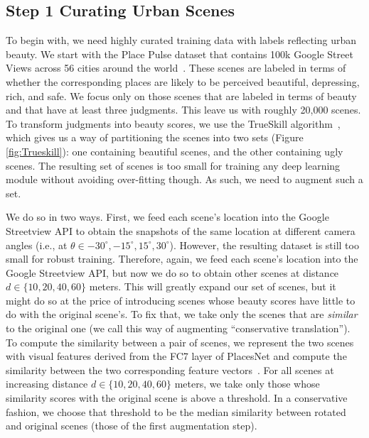 \subsection*{Step 1 Curating Urban Scenes}
To begin with, we need highly curated training data with labels reflecting urban beauty. We start with the  Place Pulse dataset that contains 100k Google Street Views across 56 cities around the world~\cite{dubey2016deep}. These scenes are labeled in terms of whether the corresponding places are likely to be perceived beautiful, depressing, rich, and safe. We focus only on those scenes that are labeled in terms of beauty and that have at least three judgments. This leave us with roughly  20,000 scenes. To transform judgments into beauty scores, we use the TrueSkill algorithm~\cite{herbrich2007trueskill}, which gives us a way of partitioning the scenes into two sets (Figure \ref{fig:Trueskill}): one containing beautiful scenes, and the other containing ugly scenes. The resulting set of scenes is too small for training any deep learning module without avoiding over-fitting though. As such, we need to augment such a set. 

We do so in two ways. First, we feed each scene's location into the Google Streetview API to obtain  the snapshots of the same location at different camera angles (i.e., at $\theta \in {-30^{\circ}, -15^{\circ} , 15^{\circ} , 30^{\circ} }$). However, the resulting dataset is still too small for robust training. Therefore, again, we feed each scene's location into the Google Streetview API, but now we do so to obtain other scenes at  distance $d \in \{10,20,40,60\}$ meters.  This will greatly expand our set of scenes, but it might do so at the price of introducing scenes whose beauty scores have little to do with the original scene's. To fix that, we take only the scenes that are \emph{similar} to the original one (we call this way of augmenting ``conservative translation''). To compute the similarity between a pair of scenes, we represent the two scenes with visual features derived from the FC7 layer of PlacesNet and compute the similarity between the two corresponding feature vectors~\cite{zhou2014learning}. For all scenes at increasing distance $d \in \{10,20,40,60\}$ meters,  we take only those whose similarity scores with the original scene is above a threshold. In a conservative fashion, we choose that threshold to be the median similarity between rotated and original scenes (those of the first augmentation step). 

